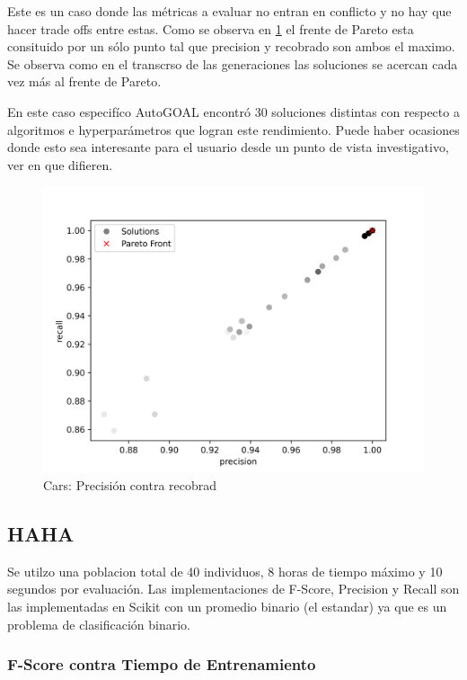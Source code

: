 Este es un caso donde las m\'etricas a evaluar no entran en conflicto y no hay que hacer trade offs entre estas. Como se observa en \ref{impl:fig:cars:precision_vs_recall} el frente de Pareto esta consituido por un s\'olo punto tal que precision y recobrado son ambos el maximo. Se observa como en el transcrso de las generaciones las soluciones se acercan cada vez m\'as al frente de Pareto.

En este caso especif\'ico AutoGOAL encontr\'o 30 soluciones distintas con respecto a algoritmos e hyperpar\'ametros que logran este rendimiento. Puede haber ocasiones donde esto sea interesante para el usuario desde un punto de vista investigativo, ver en que difieren.


\begin{figure}[ht]
    \centering
    \includegraphics[scale=0.8]{Pictures/cars_precision_vs_recall.jpg}
    \caption{Cars: Precisi\'on contra recobrad}
    \label{impl:fig:cars:precision_vs_recall}
\end{figure}

\subsection{HAHA}

Se utilzo una poblacion total de 40 individuos, 8 horas de tiempo m\'aximo y 10 segundos por  evaluaci\'on. Las implementaciones de F-Score, Precision y Recall son las implementadas en Scikit con un promedio binario (el estandar) ya que es un problema de clasificaci\'on binario.

\subsubsection{F-Score contra Tiempo de Entrenamiento}

